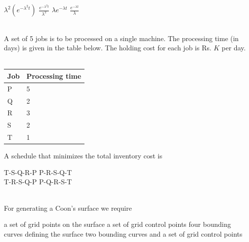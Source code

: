 \documentclass[addpoints,11pt]{exam}
\begin{document}
\begin{questions}
    \begin{oneparchoices}
        \choice $\lambda^2(e^{-\lambda^2t})$
        \choice $\frac{e^{-\lambda^2t}}{\lambda^2}$
        \choice $\lambda e^{-\lambda t}$
        \choice $\frac{e^{-\lambda t}}{\lambda}$
    \end{oneparchoices}\\

    \question A set of 5 jobs is to be processed on a single machine. The processing time (in days) is given in the table below. The holding cost for each job is Rs. $K$ per day.\\\\
    \begin{center}
        \begin{tabular}{|l|l|}
            \hline
            \textbf{Job} & \textbf{Processing time} \\
            \hline
            P            & 5                        \\\hline
            Q            & 2                        \\\hline
            R            & 3                        \\\hline
            S            & 2                        \\\hline
            T            & 1                        \\\hline
        \end{tabular}
    \end{center}
    A schedule that minimizes the total inventory cost is

    \begin{oneparchoices}
        \choice T-S-Q-R-P
        \choice P-R-S-Q-T\\
        \choice T-R-S-Q-P
        \choice P-Q-R-S-T
    \end{oneparchoices}\\

    \question For generating a Coon's surface we require\\
    \begin{choices}
        \choice a set of grid points on the surface
        \choice a set of grid control points
        \choice four bounding curves defining the surface
        \choice two bounding curves and a set of grid control points
    \end{choices}


\end{questions}
\end{document}
